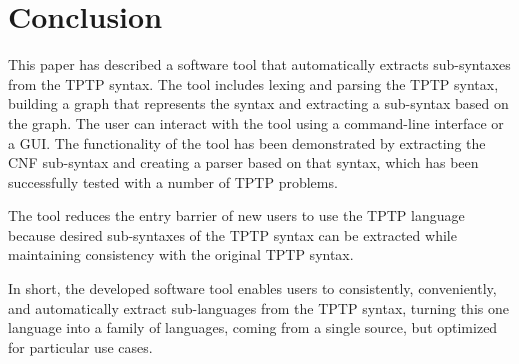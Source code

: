 
\chapter{Conclusion}\label{cha:Conclusion}

This paper has described a software tool that automatically extracts sub-syntaxes from the \ac{TPTP} syntax. 
The tool includes lexing and parsing the \ac{TPTP} syntax, building 
a graph that represents the syntax and extracting a sub-syntax based on the graph. The user can interact with the tool using a command-line interface or a GUI.
The functionality of the tool has been demonstrated by extracting the \ac{CNF} sub-syntax and creating a parser based on that syntax, which has been successfully tested with a number of \ac{TPTP} problems.

The tool reduces the entry barrier of new users to use the \ac{TPTP} language because desired sub-syntaxes of the \ac{TPTP} syntax can be extracted while maintaining consistency with the original \ac{TPTP} syntax.

In short, the developed software tool enables users to consistently, conveniently, and automatically extract sub-languages from the \ac{TPTP} syntax, turning this one language into a family of languages, coming from a single source, but optimized for particular use cases.
%
%
%
%

